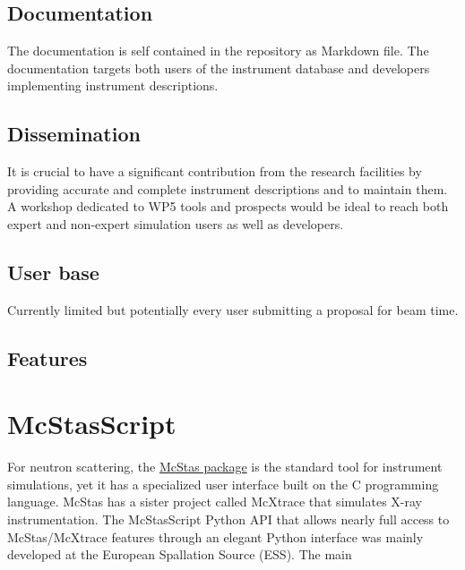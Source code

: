 \documentclass[11pt, a4paper]{article}
\begin{document}

\subsection{Documentation}
The documentation is self contained in the repository as Markdown file. 
The documentation targets both users of the instrument database and developers implementing instrument descriptions.

\subsection{Dissemination}
It is crucial to have a significant contribution from the research facilities by providing accurate and complete instrument descriptions and to maintain them.
A workshop dedicated to WP5 tools and prospects would be ideal to reach both expert and non-expert simulation users as well as developers.

\subsection{User base}
Currently limited but potentially every user submitting a proposal for beam time.


\subsection{Features}




\section{McStasScript\label{sec:mcstasscript}}

For neutron scattering, the \href{https://www.mcstas.org}{McStas
  package} is the standard tool for instrument simulations, yet it has a
specialized user interface built on the C programming language. McStas has a
sister project called McXtrace that simulates X-ray instrumentation.
The McStasScript Python API that allows
nearly full access to McStas/McXtrace features through an elegant Python
interface was mainly developed at the European Spallation Source (ESS). The main
\end{document}
